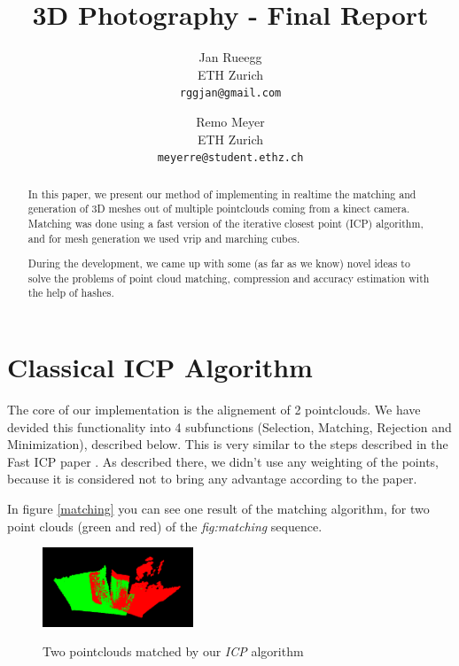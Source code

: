 \documentclass[10pt,twocolumn,letterpaper]{article}
\begin{document}
\title{3D Photography - Final Report}

\author{Jan Rueegg\\
ETH Zurich\\
{\tt\small rggjan@gmail.com}
\and
Remo Meyer\\
ETH Zurich\\
{\tt\small meyerre@student.ethz.ch}
}

\maketitle
\thispagestyle{empty}

\begin{abstract}
In this paper, we present our method of implementing in realtime the matching and generation of 3D meshes out of multiple pointclouds coming from a kinect
camera. Matching was done using a fast version of the iterative closest point (ICP) algorithm, and for mesh generation we used vrip and marching cubes.

During the development, we came up with some (as far as we know) novel ideas to solve the problems of point cloud matching, compression and accuracy
estimation with the help of hashes.
\end{abstract}

\section{Classical ICP Algorithm}
The core of our implementation is the alignement of 2 pointclouds. 
We have devided this functionality into 4 subfunctions (Selection, Matching, Rejection and Minimization), described below. This is very
similar to the steps described in the Fast ICP paper \cite{fasticp}. As described there, we didn't use any weighting of the points,
because it is considered not to bring any advantage according to the paper.

In figure \ref{matching} you can see one result of the matching algorithm, for two point clouds (green and red) of the \textit{fig:matching} sequence.

\begin{figure}
  \centering
  \includegraphics[width=0.4\textwidth]{matching}
  \label{fig:matching}
  \caption{Two pointclouds matched by our \textit{ICP} algorithm}
\end{figure}
\end{document}
